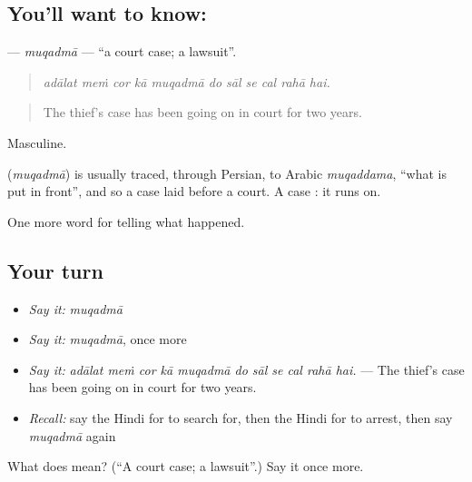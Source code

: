 \subsection*{You'll want to know: }
\textbf{} — \emph{muqadmā} — \textquotedblleft{}a court case; a lawsuit\textquotedblright{}.

\begin{quote}
          
\end{quote}

\begin{quote}
\emph{adālat meṁ cor kā muqadmā do sāl se cal rahā hai.}
\end{quote}

\begin{quote}
The thief's case has been going on in court for two years.
\end{quote}

Masculine.

\begin{cousinweb}
\textbf{} (\emph{muqadmā}) is usually traced, through Persian, to Arabic \emph{muqaddama}, \textquotedblleft{}what is put in front\textquotedblright{}, and so a case laid before a court. A case \textbf{ }: it runs on.
\end{cousinweb}

\begin{grammarlens}[title={What you've built}]
One more word for telling what happened.
\end{grammarlens}

\subsection*{Your turn}
\begin{itemize}
\raggedright
  \item \emph{Say it:} \emph{muqadmā}
  \item \emph{Say it:} \emph{muqadmā}, once more
  \item \emph{Say it:} \emph{adālat meṁ cor kā muqadmā do sāl se cal rahā hai.} — The thief's case has been going on in court for two years.
  \item \emph{Recall:} say the Hindi for to search for, then the Hindi for to arrest, then say \emph{muqadmā} again
\end{itemize}

\begin{tcolorbox}[breakable,colback=teal!4,colframe=teal!35!black,title={Before you move on}]
What does  mean? (\textquotedblleft{}A court case; a lawsuit\textquotedblright{}.) Say it once more.
\end{tcolorbox}
